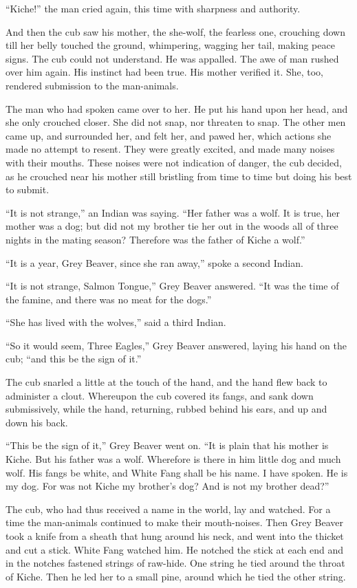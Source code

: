 \documentclass[10pt]{book}
\begin{document}
“Kiche!” the man cried again, this time with sharpness and authority.

And then the cub saw his mother, the she-wolf, the fearless one,
crouching down till her belly touched the ground, whimpering, wagging
her tail, making peace signs. The cub could not understand. He was
appalled. The awe of man rushed over him again. His instinct had been
true. His mother verified it. She, too, rendered submission to the
man-animals.

The man who had spoken came over to her. He put his hand upon her head,
and she only crouched closer. She did not snap, nor threaten to snap.
The other men came up, and surrounded her, and felt her, and pawed her,
which actions she made no attempt to resent. They were greatly excited,
and made many noises with their mouths. These noises were not
indication of danger, the cub decided, as he crouched near his mother
still bristling from time to time but doing his best to submit.

“It is not strange,” an Indian was saying. “Her father was a wolf. It
is true, her mother was a dog; but did not my brother tie her out in
the woods all of three nights in the mating season? Therefore was the
father of Kiche a wolf.”

“It is a year, Grey Beaver, since she ran away,” spoke a second Indian.

“It is not strange, Salmon Tongue,” Grey Beaver answered. “It was the
time of the famine, and there was no meat for the dogs.”

“She has lived with the wolves,” said a third Indian.

“So it would seem, Three Eagles,” Grey Beaver answered, laying his hand
on the cub; “and this be the sign of it.”

The cub snarled a little at the touch of the hand, and the hand flew
back to administer a clout. Whereupon the cub covered its fangs, and
sank down submissively, while the hand, returning, rubbed behind his
ears, and up and down his back.

“This be the sign of it,” Grey Beaver went on. “It is plain that his
mother is Kiche. But his father was a wolf. Wherefore is there in him
little dog and much wolf. His fangs be white, and White Fang shall be
his name. I have spoken. He is my dog. For was not Kiche my brother’s
dog? And is not my brother dead?”

The cub, who had thus received a name in the world, lay and watched.
For a time the man-animals continued to make their mouth-noises. Then
Grey Beaver took a knife from a sheath that hung around his neck, and
went into the thicket and cut a stick. White Fang watched him. He
notched the stick at each end and in the notches fastened strings of
raw-hide. One string he tied around the throat of Kiche. Then he led
her to a small pine, around which he tied the other string.
\end{document}
